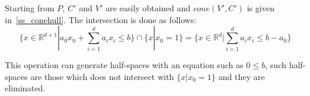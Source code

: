 Starting from $P$, $C'$ and $V'$ are easily obtained and $cone(V',C')$ is given in~\ref{ss_conehull}. The intersection is done as follows:
$$ \{ x\in \mathbb{R}^{d+1}| a_0x_0+\sum_{i=1}^da_ix_i\leq b\}\cap \{x|x_0=1\}=\{x\in \mathbb{R}^d|\sum_{i=1}^da_ix_i\leq b-a_0\}$$

This operation can generate half-spaces with an equation such as $0\leq b$, such half-spaces are those which does not intersect with $\{x|x_0=1\}$ and they are eliminated.





